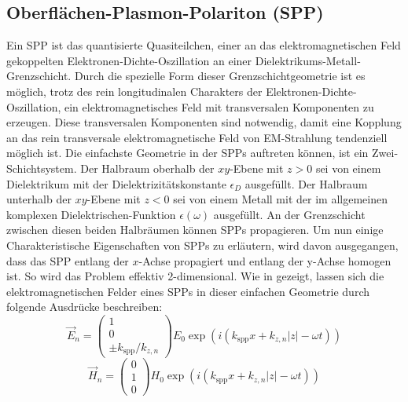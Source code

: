 \documentclass[titlepage]{article}
\begin{document}
	\subsection{Oberflächen-Plasmon-Polariton (SPP)}		
	Ein SPP ist das quantisierte Quasiteilchen, einer an das elektromagnetischen Feld gekoppelten Elektronen-Dichte-Oszillation an einer Dielektrikums-Metall-Grenzschicht. Durch die spezielle Form dieser Grenzschichtgeometrie ist es möglich, trotz des rein longitudinalen Charakters der Elektronen-Dichte-Oszillation, ein elektromagnetisches Feld mit transversalen Komponenten zu erzeugen. Diese transversalen Komponenten sind notwendig, damit eine Kopplung an das rein transversale elektromagnetische Feld von EM-Strahlung tendenziell möglich ist. Die einfachste Geometrie in der SPPs auftreten können, ist ein Zwei-Schichtsystem. Der Halbraum oberhalb der $xy$-Ebene mit $z>0$ sei von einem Dielektrikum mit der Dielektrizitätskonstante $\epsilon_D$ ausgefüllt. Der Halbraum unterhalb der $xy$-Ebene mit $z<0$ sei von einem Metall mit der im allgemeinen komplexen Dielektrischen-Funktion $\epsilon(\omega)$ ausgefüllt. An der Grenzschicht zwischen diesen beiden Halbräumen können SPPs propagieren. Um nun einige Charakteristische Eigenschaften von SPPs zu erläutern, wird davon ausgegangen, dass das SPP entlang der $x$-Achse propagiert und entlang der y-Achse homogen ist. So wird das Problem effektiv 2-dimensional. Wie in \cite{Maier.2007} gezeigt, lassen sich die elektromagnetischen Felder eines SPPs in dieser einfachen Geometrie durch folgende Ausdrücke beschreiben:
	\begin{equation}
		\label{eq:electric_field_spp}
		\vec{E}_n = \begin{pmatrix} 1 \\ 0 \\ \pm k_{\mathrm{spp}}/k_{z,n} \end{pmatrix} E_0 \exp\left(i(k_{\mathrm{spp}}x + k_{z, n}|z|-\omega t)\right)	
	\end{equation}
	\begin{equation}
		\label{eq:magnetic_field_spp}
		\vec{H}_n = \begin{pmatrix} 0 \\ 1 \\ 0 \end{pmatrix} H_0 \exp\left(i(k_{\mathrm{spp}}x + k_{z, n}|z|-\omega t)\right)
	\end{equation}
\end{document}
